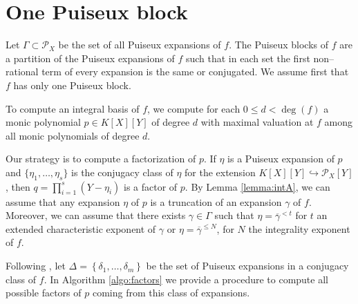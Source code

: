 \documentclass[a4paper,11pt]{amsart}%
\theoremstyle{definition}
\theoremstyle{plain}
\theoremstyle{remark}
\newcommand{\Px}{{\mathcal{P}_X}}
\begin{document}
\section{One Puiseux block}

Let $\Gamma \subset \Px$ be the set of all Puiseux expansions of $f$. The Puiseux blocks of $f$ are a partition of the Puiseux expansions of $f$ such that in each set the first non--rational term of every expansion is the same or conjugated. We assume first that $f$ has only one Puiseux block.

To compute an integral basis of $f$, we compute for each $0 \le d < \deg(f)$ a monic polynomial $p \in K[X][Y]$ of degree $d$ with maximal valuation at $f$ among all monic polynomials of degree $d$.

Our strategy is to compute a factorization of $p$. If $\eta$ is a Puiseux expansion of $p$ and $\{\eta_1, \dots, \eta_s\}$ is the conjugacy class of $\eta$ for the extension $K[X][Y] \hookrightarrow \Px[Y]$, then $q = \prod_{i = 1}^s (Y - \eta_i)$ is a factor of $p$.
By Lemma \ref{lemma:intA}, we can assume that any expansion $\eta$ of $p$ is a truncation of an expansion $\gamma$ of $f$. Moreover, we can assume that there exists $\gamma \in \Gamma$ such that $\eta = \overline{\gamma}^{<t}$ for $t$ an extended characteristic exponent of $\gamma$ or $\eta = \overline{\gamma}^{\le N}$, for $N$ the integrality exponent of $f$.

%

Following \cite[Algorithm 6]{intbas}, let $\Delta=\left\{  \delta_{1},\ldots,\delta_{m}\right\}$ be
the set of Puiseux expansions in a conjugacy class of $f$. In Algorithm \ref{algo:factors} we provide a procedure to compute all possible factors of $p$ coming from this class of expansions.
\end{document}
